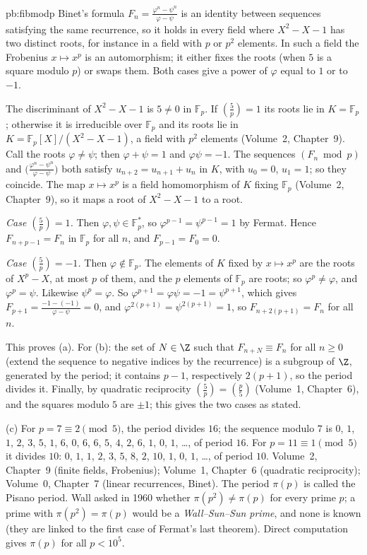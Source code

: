 \begin{solution}{pb:fibmodp}
\idea Binet's formula $F_n=\frac{\varphi^n-\psi^n}{\varphi-\psi}$ is an identity between sequences satisfying the same
recurrence, so it holds in every field where $X^2-X-1$ has two distinct roots, for instance in a field with $p$ or $p^2$
elements. In such a field the Frobenius $x\mapsto x^p$ is an automorphism; it either fixes the roots (when $5$ is a square
modulo $p$) or swaps them. Both cases give a power of $\varphi$ equal to $1$ or to $-1$.

\writeup The discriminant of $X^2-X-1$ is $5\ne0$ in $\mathbb F_p$. If $\left(\frac5p\right)=1$ its roots lie in $K=\mathbb
F_p$; otherwise it is irreducible over $\mathbb F_p$ and its roots lie in $K=\mathbb F_p[X]/(X^2-X-1)$, a field with $p^2$
elements (Volume~2, Chapter~9). Call the roots $\varphi\ne\psi$; then $\varphi+\psi=1$ and $\varphi\psi=-1$. The sequences
$(F_n\bmod p)$ and $\bigl(\frac{\varphi^n-\psi^n}{\varphi-\psi}\bigr)$ both satisfy $u_{n+2}=u_{n+1}+u_n$ in $K$, with
$u_0=0$, $u_1=1$; so they coincide. The map $x\mapsto x^p$ is a field homomorphism of $K$ fixing $\mathbb F_p$ (Volume~2,
Chapter~9), so it maps a root of $X^2-X-1$ to a root.

\emph{Case $\left(\frac5p\right)=1$.} Then $\varphi,\psi\in\mathbb F_p^*$, so $\varphi^{p-1}=\psi^{p-1}=1$ by Fermat. Hence
$F_{n+p-1}=F_n$ in $\mathbb F_p$ for all $n$, and $F_{p-1}=F_0=0$.

\emph{Case $\left(\frac5p\right)=-1$.} Then $\varphi\notin\mathbb F_p$. The elements of $K$ fixed by $x\mapsto x^p$ are the
roots of $X^p-X$, at most $p$ of them, and the $p$ elements of $\mathbb F_p$ are roots; so $\varphi^p\ne\varphi$, and
$\varphi^p=\psi$. Likewise $\psi^p=\varphi$. So $\varphi^{p+1}=\varphi\psi=-1=\psi^{p+1}$, which gives
$F_{p+1}=\frac{-1-(-1)}{\varphi-\psi}=0$, and $\varphi^{2(p+1)}=\psi^{2(p+1)}=1$, so $F_{n+2(p+1)}=F_n$ for all $n$.

This proves (a). For (b): the set of $N\in\Z$ such that $F_{n+N}\equiv F_n$ for all $n\ge0$ (extend the sequence to negative
indices by the recurrence) is a subgroup of $\Z$, generated by the period; it contains $p-1$, respectively $2(p+1)$, so the
period divides it. Finally, by quadratic reciprocity $\left(\frac5p\right)=\left(\frac p5\right)$ (Volume~1, Chapter~6), and the
squares modulo $5$ are $\pm1$; this gives the two cases as stated.

(c) For $p=7\equiv2\pmod5$, the period divides $16$; the sequence modulo $7$ is $0$, $1$, $1$, $2$, $3$, $5$, $1$, $6$, $0$, $6$, $6$, $5$, $4$, $2$, $6$, $1$, $0$, $1$, \dots,
of period $16$. For $p=11\equiv1\pmod5$ it divides $10$: $0$, $1$, $1$, $2$, $3$, $5$, $8$, $2$, $10$, $1$, $0$, $1$, \dots, of period $10$.
\tools Volume~2, Chapter~9 (finite fields, Frobenius); Volume~1, Chapter~6 (quadratic reciprocity); Volume~0, Chapter~7 (linear
recurrences, Binet).
\leads The period $\pi(p)$ is called the Pisano period. Wall asked in 1960 whether $\pi(p^2)\ne\pi(p)$ for every prime $p$; a
prime with $\pi(p^2)=\pi(p)$ would be a \emph{Wall--Sun--Sun prime}, and none is known (they are linked to the first case of
Fermat's last theorem). Direct computation gives $\pi(p)$ for all $p<10^5$.
\end{solution}


